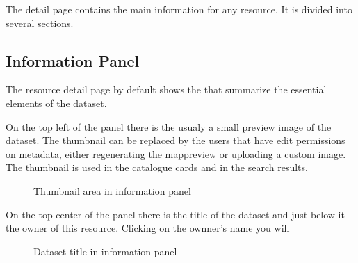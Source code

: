 \documentclass[letterpaper,10pt,english]{sphinxmanual}
\begin{document}
\sphinxAtStartPar
The detail page contains the main information for any resource. It is divided into
several sections.


\subsection{Information Panel}
\label{\detokenize{02_find_and_visualize:information-panel}}
\sphinxAtStartPar
The resource detail page by default shows the  that summarize the essential elements of the dataset.

\sphinxAtStartPar
On the top left of the panel there is the   usualy a small preview image of the dataset.
The thumbnail can be replaced by the users that have edit permissions on metadata, either re\sphinxhyphen{}generating
the map\sphinxhyphen{}preview or uploading a custom image. The thumbnail is used in the catalogue cards and in the search results.

\begin{figure}[htbp]
\centering
\capstart

\noindent{}
\caption{Thumbnail area in information panel}\label{\detokenize{02_find_and_visualize:id11}}\end{figure}

\sphinxAtStartPar
On the top center of the panel there is the title of the dataset and just below it the owner of this resource.
Clicking on the ownner’s name you will

\begin{figure}[htbp]
\centering
\capstart

\noindent{}
\caption{Dataset title in information panel}\label{\detokenize{02_find_and_visualize:id12}}\end{figure}
\end{document}
